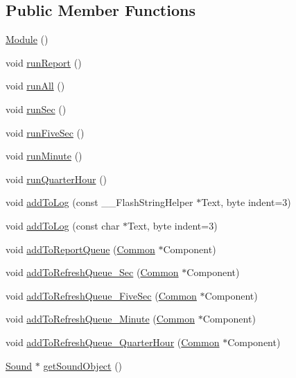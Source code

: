 \subsection*{Public Member Functions}
\begin{DoxyCompactItemize}
\item 
\hyperlink{class_module_a5a240a8a9ab1813b17bcb810b24ceaea}{Module} ()
\item 
void \hyperlink{class_module_ab66ea27e8ca0041539f6a563b455ab70}{run\+Report} ()
\item 
void \hyperlink{class_module_a7ed8e04ba630f6734ac15d06c4eae999}{run\+All} ()
\item 
void \hyperlink{class_module_ace01fc8566dc1d6367560d1ac61c2c18}{run\+Sec} ()
\item 
void \hyperlink{class_module_adb37fcc3cf7c1a693e5b6e92a873bf72}{run\+Five\+Sec} ()
\item 
void \hyperlink{class_module_aa13cfb83b001955abfeb3b87789a7ab8}{run\+Minute} ()
\item 
void \hyperlink{class_module_af56e1160074693aaa5699fafaae9d8be}{run\+Quarter\+Hour} ()
\item 
void \hyperlink{class_module_a5dfb18333a2943155a7fd6a4602e00a7}{add\+To\+Log} (const \+\_\+\+\_\+\+Flash\+String\+Helper $\ast$Text, byte indent=3)
\item 
void \hyperlink{class_module_a43676805f035e9640429667abdea07e6}{add\+To\+Log} (const char $\ast$Text, byte indent=3)
\item 
void \hyperlink{class_module_aee2cbab440d38d29948205820ad50be8}{add\+To\+Report\+Queue} (\hyperlink{class_common}{Common} $\ast$Component)
\item 
void \hyperlink{class_module_a08595d2a2bd347eec39c47a3b9e770fb}{add\+To\+Refresh\+Queue\+\_\+\+Sec} (\hyperlink{class_common}{Common} $\ast$Component)
\item 
void \hyperlink{class_module_a2dffaa526893d852b722cf890a6821c6}{add\+To\+Refresh\+Queue\+\_\+\+Five\+Sec} (\hyperlink{class_common}{Common} $\ast$Component)
\item 
void \hyperlink{class_module_a20d1125116f9a8c71339fde4626c5adb}{add\+To\+Refresh\+Queue\+\_\+\+Minute} (\hyperlink{class_common}{Common} $\ast$Component)
\item 
void \hyperlink{class_module_a25f5e60e0db8e157fee631928f745e82}{add\+To\+Refresh\+Queue\+\_\+\+Quarter\+Hour} (\hyperlink{class_common}{Common} $\ast$Component)
\item 
\hyperlink{class_sound}{Sound} $\ast$ \hyperlink{class_module_a1c18e93583f527d470be447a9fcd1a0b}{get\+Sound\+Object} ()

\end{DoxyCompactItemize}
